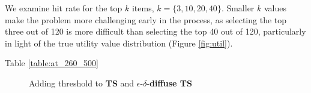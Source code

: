 \documentclass[nonblindrev]{informs3}
\newcommand{\eric}[1]{\textcolor{red}{\textbf{(eric)} #1}}
\newcommand{\ts}{\textbf{TS} }
\newcommand{\edts}{$\epsilon$-$\delta$-\textbf{diffuse TS} }
\newcommand{\tsthres}{\textbf{TS-thres} }
\newcommand{\edtsthres}{$\epsilon$-$\delta$-\textbf{TS-thres} }
\begin{document}
We examine hit rate for the top $k$ items, $k = \{3,10,20,40\}$. Smaller $k$ values make the problem more challenging early in the process, as selecting the top three out of 120 is more difficult than selecting the top 40 out of 120, particularly in light of the true utility value distribution (Figure \ref{fig:util}).  

 Table \ref{table:at_260_500} 




\begin{figure}%
    \caption{Adding threshold to \ts and \edts}%
    \label{fig:threshold_edts_hit10vs20}%
 	\begin{center}
    \qquad
	\end{center}
\end{figure}
\end{document}
